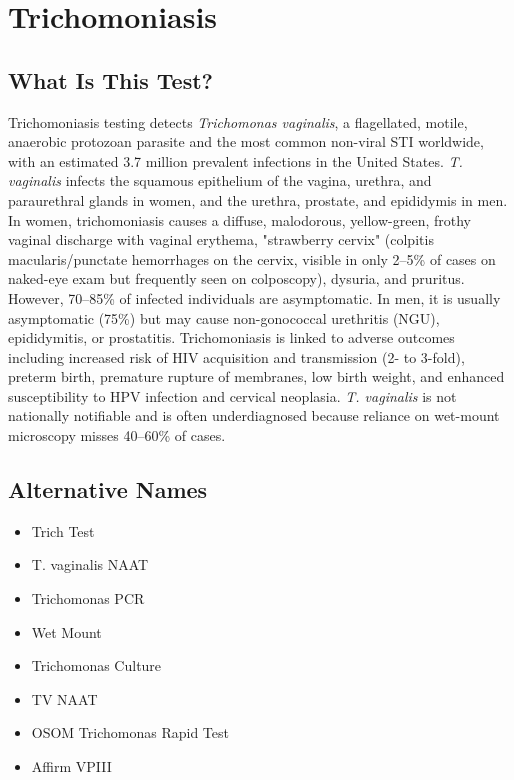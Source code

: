 \chapter{Trichomoniasis}

\section*{What Is This Test?}
Trichomoniasis testing detects \textit{Trichomonas vaginalis}, a flagellated, motile, anaerobic protozoan parasite and the most common non-viral STI worldwide, with an estimated 3.7 million prevalent infections in the United States. \textit{T. vaginalis} infects the squamous epithelium of the vagina, urethra, and paraurethral glands in women, and the urethra, prostate, and epididymis in men. In women, trichomoniasis causes a diffuse, malodorous, yellow-green, frothy vaginal discharge with vaginal erythema, "strawberry cervix" (colpitis macularis/punctate hemorrhages on the cervix, visible in only 2--5\% of cases on naked-eye exam but frequently seen on colposcopy), dysuria, and pruritus. However, 70--85\% of infected individuals are asymptomatic. In men, it is usually asymptomatic (75\%) but may cause non-gonococcal urethritis (NGU), epididymitis, or prostatitis. Trichomoniasis is linked to adverse outcomes including increased risk of HIV acquisition and transmission (2- to 3-fold), preterm birth, premature rupture of membranes, low birth weight, and enhanced susceptibility to HPV infection and cervical neoplasia. \textit{T. vaginalis} is not nationally notifiable and is often underdiagnosed because reliance on wet-mount microscopy misses 40--60\% of cases.

\section*{Alternative Names}
\begin{itemize}
  \item Trich Test
  \item T. vaginalis NAAT
  \item Trichomonas PCR
  \item Wet Mount
  \item Trichomonas Culture
  \item TV NAAT
  \item OSOM Trichomonas Rapid Test
  \item Affirm VPIII
\end{itemize}
